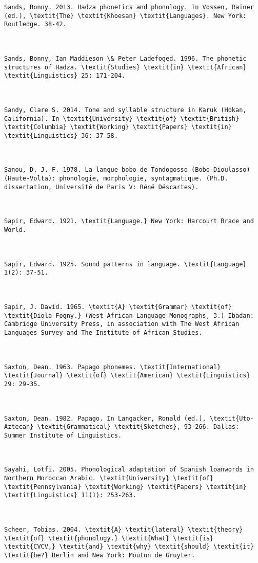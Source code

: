 \begin{verbatim}
Sands, Bonny. 2013. Hadza phonetics and phonology. In Vossen, Rainer (ed.), \textit{The} \textit{Khoesan} \textit{Languages}. New York: Routledge. 38-42.



Sands, Bonny, Ian Maddieson \& Peter Ladefoged. 1996. The phonetic structures of Hadza. \textit{Studies} \textit{in} \textit{African} \textit{Linguistics} 25: 171-204.



Sandy, Clare S. 2014. Tone and syllable structure in Karuk (Hokan, California). In \textit{University} \textit{of} \textit{British} \textit{Columbia} \textit{Working} \textit{Papers} \textit{in} \textit{Linguistics} 36: 37-58.



Sanou, D. J. F. 1978. La langue bobo de Tondogosso (Bobo-Dioulasso) (Haute-Volta): phonologie, morphologie, syntagmatique. (Ph.D. dissertation, Université de Paris V: Réné Déscartes).



Sapir, Edward. 1921. \textit{Language.} New York: Harcourt Brace and World.



Sapir, Edward. 1925. Sound patterns in language. \textit{Language} 1(2): 37-51.



Sapir, J. David. 1965. \textit{A} \textit{Grammar} \textit{of} \textit{Diola-Fogny.} (West African Language Monographs, 3.) Ibadan: Cambridge University Press, in association with The West African Languages Survey and The Institute of African Studies.



Saxton, Dean. 1963. Papago phonemes. \textit{International} \textit{Journal} \textit{of} \textit{American} \textit{Linguistics} 29: 29-35.



Saxton, Dean. 1982. Papago. In Langacker, Ronald (ed.), \textit{Uto-Aztecan} \textit{Grammatical} \textit{Sketches}, 93-266. Dallas: Summer Institute of Linguistics.



Sayahi, Lotfi. 2005. Phonological adaptation of Spanish loanwords in Northern Moroccan Arabic. \textit{University} \textit{of} \textit{Pennsylvania} \textit{Working} \textit{Papers} \textit{in} \textit{Linguistics} 11(1): 253-263.



Scheer, Tobias. 2004. \textit{A} \textit{lateral} \textit{theory} \textit{of} \textit{phonology.} \textit{What} \textit{is} \textit{CVCV,} \textit{and} \textit{why} \textit{should} \textit{it} \textit{be?} Berlin and New York: Mouton de Gruyter.




\end{verbatim}
